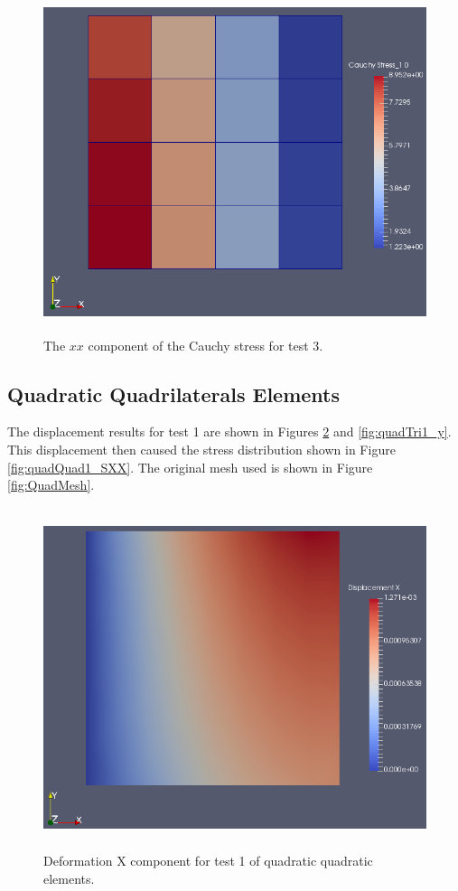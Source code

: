 \documentclass[a4paper, 12pt]{article}
\begin{document}
\begin{figure}[H]
  \centering
  \includegraphics[width=13cm, height=10cm]{quad_4_t3_Sxx}
  \caption{The $xx$ component of the Cauchy stress for test 3.}
  \label{fig:linQuad3_SXX}
\end{figure}

\subsection{Quadratic Quadrilaterals Elements} \label{subsec:quadQuads}
The displacement results for test 1 are shown in 
Figures \ref{fig:quadQuad1_x} and \ref{fig:quadTri1_y}.
This displacement then caused the stress distribution 
shown in Figure \ref{fig:quadQuad1_SXX}.
The original mesh used is shown in Figure \ref{fig:QuadMesh}.

\begin{figure}[H]
  \centering
  \includegraphics[width=13cm, height=10cm]{Qquad_4_t1_disp_X}
  \caption{Deformation X component for test 1 of quadratic
            quadratic elements.}
  \label{fig:quadQuad1_x}
\end{figure}
\end{document}
